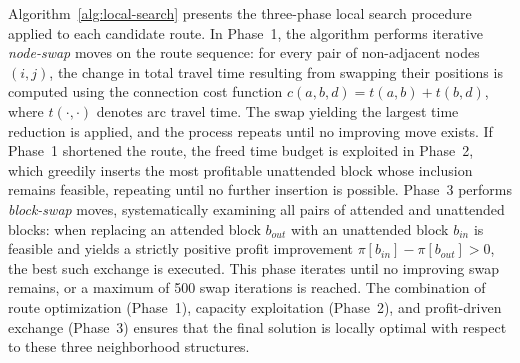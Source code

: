 
Algorithm~\ref{alg:local-search} presents the three-phase local search procedure applied
to each candidate route. In Phase~1, the algorithm performs iterative \textit{node-swap}
moves on the route sequence: for every pair of non-adjacent nodes $(i, j)$, the change in
total travel time resulting from swapping their positions is computed using the connection
cost function $c(a, b, d)= t(a,b) + t(b,d)$, where $t(\cdot,\cdot)$ denotes arc travel
time. The swap yielding the largest time reduction is applied, and the process repeats
until no improving move exists. If Phase~1 shortened the route, the freed time budget is
exploited in Phase~2, which greedily inserts the most profitable unattended block whose
inclusion remains feasible, repeating until no further insertion is possible. Phase~3
performs \textit{block-swap} moves, systematically examining all pairs of attended and
unattended blocks: when replacing an attended block $b_{out}$ with an unattended block
$b_{in}$ is feasible and yields a strictly positive profit improvement
$\pi[b_{in}] - \pi[b_{out}] > 0$, the best such exchange is executed. This phase iterates
until no improving swap remains, or a maximum of 500 swap iterations is reached. The combination of route optimization (Phase~1),
capacity exploitation (Phase~2), and profit-driven exchange (Phase~3) ensures that the
final solution is locally optimal with respect to these three neighborhood structures.

